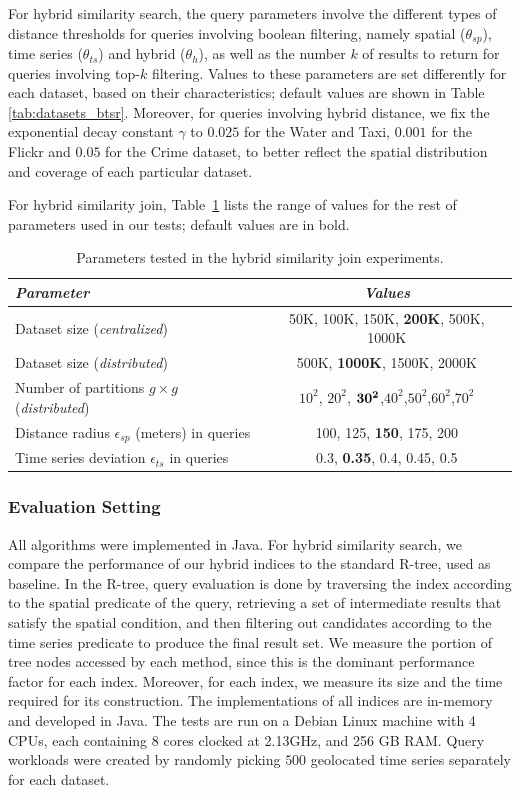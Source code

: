 For hybrid similarity search, the query parameters involve the different types of distance thresholds for queries involving boolean filtering, namely spatial ($\theta_{sp}$), time series ($\theta_{ts}$) and hybrid ($\theta_h$), as well as the number $k$ of results to return for queries involving top-$k$ filtering. Values to these parameters are set differently for each dataset, based on their characteristics; default values are shown in Table \ref{tab:datasets_btsr}. Moreover, for queries involving hybrid distance, we fix the exponential decay constant $\gamma$ to $0.025$ for the Water and Taxi, $0.001$ for the Flickr and $0.05$ for the Crime dataset, to better reflect the spatial distribution and coverage of each particular dataset.

For hybrid similarity join, Table~\ref{tab:parameters} lists the range of values for the rest of parameters used in our tests; default values are in bold.

\begin{table}[!ht]
	\centering
	\caption{Parameters tested in the hybrid similarity join experiments.}
	\begin{tabular}{lc} 
	\hline
	{\em Parameter} &{\em Values} \\
	\hline
	Dataset size ({\em centralized}) & 50K, 100K, 150K, {\bf 200K}, 500K, 1000K \\
	Dataset size ({\em distributed}) & 500K, {\bf 1000K}, 1500K, 2000K \\
	Number of partitions $g\times g$ ({\em distributed}) & $10^2$, $20^2$, ${\bf 30^2}$,$40^2$,$50^2$,$60^2$,$70^2$ \\
	Distance radius $\epsilon_{sp}$ (meters) in queries & 100, 125, {\bf 150}, 175, 200 \\
	Time series deviation $\epsilon_{ts}$ in queries & 0.3, {\bf 0.35}, 0.4, 0.45, 0.5 \\
	\hline
	\end{tabular}
	\label{tab:parameters}
\end{table}

\subsubsection{Evaluation Setting}

All algorithms were implemented in Java. For hybrid similarity search, we compare the performance of our hybrid indices to the standard R-tree, used as baseline. In the R-tree, query evaluation is done by traversing the index according to the spatial predicate of the query, retrieving a set of intermediate results that satisfy the spatial condition, and then filtering out candidates according to the time series predicate to produce the final result set. We measure the portion of tree nodes accessed by each method, since this is the dominant performance factor for each index. Moreover, for each index, we measure its size and the time required for its construction. The implementations of all indices are in-memory and developed in Java. The tests are run on a Debian Linux machine with 4 CPUs, each containing 8 cores clocked at 2.13GHz, and 256 GB RAM. Query workloads were created by randomly picking $500$ geolocated time series separately for each dataset.

